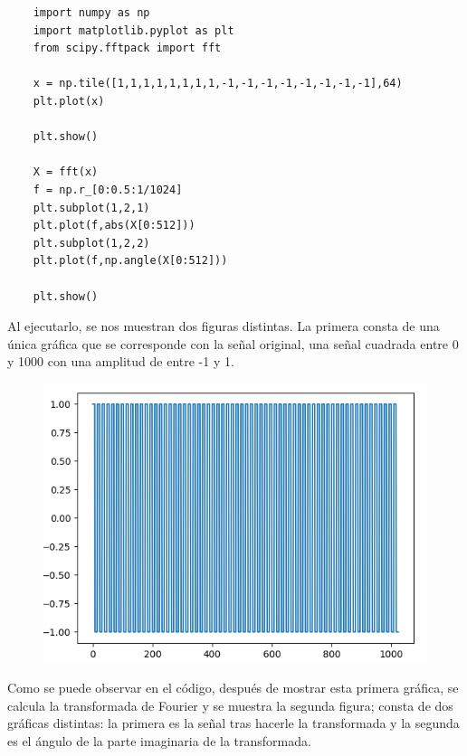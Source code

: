 \documentclass[11pt,a4paper]{article}
\begin{document}
\begin{lstlisting}
	import numpy as np
	import matplotlib.pyplot as plt
	from scipy.fftpack import fft

	x = np.tile([1,1,1,1,1,1,1,1,-1,-1,-1,-1,-1,-1,-1,-1],64)
	plt.plot(x)

	plt.show()

	X = fft(x)
	f = np.r_[0:0.5:1/1024]
	plt.subplot(1,2,1)
	plt.plot(f,abs(X[0:512]))
	plt.subplot(1,2,2)
	plt.plot(f,np.angle(X[0:512]))

	plt.show()
	\end{lstlisting}

Al ejecutarlo, se nos muestran dos figuras distintas. La primera consta de una única gráfica que se corresponde con la señal original, una señal cuadrada entre 0 y 1000 con una amplitud de entre -1 y 1.

\begin{figure}[H]
	\centering
	\includegraphics[scale=0.55]{img/signal_cuadrada.png}
\end{figure}

Como se puede observar en el código, después de mostrar esta primera gráfica, se calcula la transformada de Fourier y se muestra la segunda figura; consta de dos gráficas distintas: la primera es la señal tras hacerle la transformada y la segunda es el ángulo de la parte imaginaria de la transformada.
\end{document}
